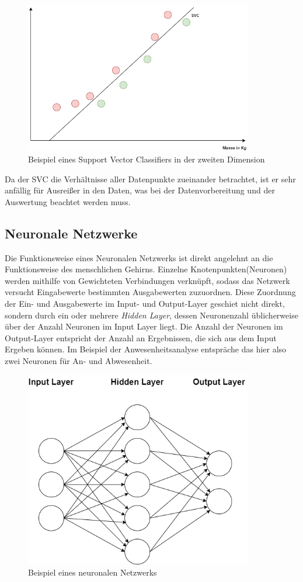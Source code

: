 \begin{figure}[h]
    \centering
    \includegraphics[width=10.0cm]{pic/SVC_2D.png}
    \caption{Beispiel eines Support Vector Classifiers in der zweiten Dimension}
    \label{fig:SVC_2D}
\end{figure}

Da der SVC die Verhältnisse aller Datenpunkte zueinander betrachtet, ist er sehr anfällig für Ausreißer in 
den Daten, was bei der Datenvorbereitung und der Auswertung beachtet werden muss.

\newpage

\subsection{Neuronale Netzwerke}
Die Funktionsweise eines Neuronalen Netzwerks ist direkt angelehnt an die Funktionsweise des menschlichen Gehirns.
Einzelne Knotenpunkten(Neuronen) werden mithilfe von Gewichteten Verbindungen verknüpft, sodass das Netzwerk versucht 
Eingabewerte bestimmten Ausgabewerten zuzuordnen. Diese Zuordnung der Ein- und Ausgabewerte im Input- und Output-Layer 
geschiet nicht direkt, sondern durch ein oder mehrere \textit{Hidden Layer}, dessen Neuronenzahl üblicherweise über 
der Anzahl Neuronen im Input Layer liegt. Die Anzahl der Neuronen im Output-Layer entspricht der Anzahl an Ergebnissen, 
die sich aus dem Input Ergeben können. Im Beispiel der Anwesenheitsanalyse entspräche das hier also zwei Neuronen für 
An- und Abwesenheit.

\begin{figure}[h]
    \centering
    \includegraphics[width=10.0cm]{pic/NN.png}
    \caption{Beispiel eines neuronalen Netzwerks}
    \label{fig:NN}
\end{figure}

